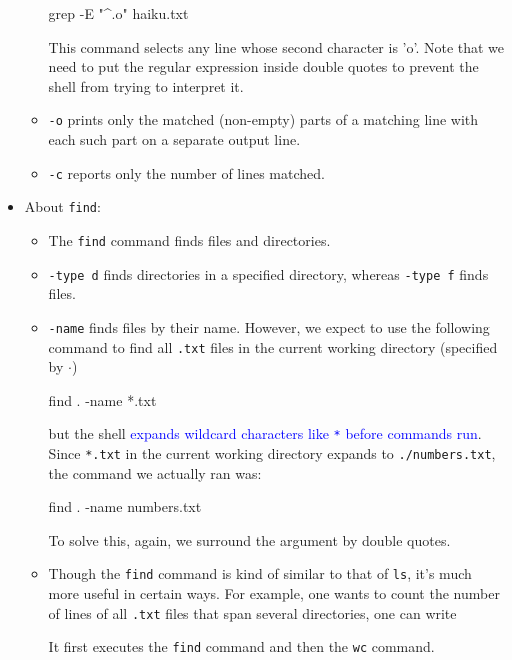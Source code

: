 \documentclass[UTF8]{book}
\newcommand{\code}[1]{\colorbox{codegray}{\texttt{#1}}}
\begin{document}
\begin{itemize}
\begin{itemize}
	\begin{bash}
grep -E "^.o" haiku.txt
	\end{bash}
	This command selects any line whose second character is 'o'. Note that we need to put the regular expression inside double quotes to prevent the shell from trying to interpret it.
	\item \code{-o} prints only the matched (non-empty) parts of a matching line with each such part on a separate output line.
	\item \code{-c} reports only the number of lines matched.
\end{itemize}
\item About \code{find}:
\begin{itemize}
	\item The \code{find} command finds files and directories.
	\item \code{-type d} finds directories in a specified directory, whereas \code{-type f} finds files.
	\item \code{-name} finds files by their name. However, we expect to use the following command to find all \code{.txt} files in the current working directory (specified by \code{$\cdot$})
	\begin{bash}
find . -name *.txt
	\end{bash}
	but the shell \textcolor{blue}{expands wildcard characters like \code{*} before commands run}. Since \code{*.txt} in the current working directory expands to \code{./numbers.txt}, the command we actually ran was:
	\begin{bash}
find . -name numbers.txt
	\end{bash}
	To solve this, again, we surround the argument by double quotes.
	\item Though the \code{find} command is kind of similar to that of \code{ls}, it's much more useful in certain ways. For example, one wants to count the number of lines of all \code{.txt} files that span several directories, one can write
	It first executes the \code{find} command and then the \code{wc} command.
\end{itemize}
\end{itemize}
\end{document}
